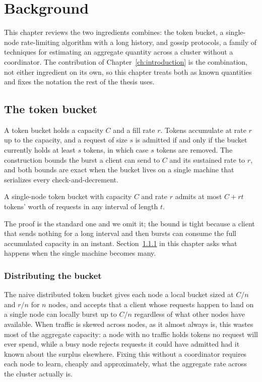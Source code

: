 \chapter{Background}
\label{ch:background}

This chapter reviews the two ingredients \sysname{} combines: the token bucket, a
single-node rate-limiting algorithm with a long history, and gossip protocols, a family of
techniques for estimating an aggregate quantity across a cluster without a coordinator. The
contribution of Chapter~\ref{ch:introduction} is the combination, not either ingredient on
its own, so this chapter treats both as known quantities and fixes the notation the rest of
the thesis uses.

\section{The token bucket}
\label{sec:token-bucket}

A token bucket holds a capacity $C$ and a fill rate $r$. Tokens accumulate at rate $r$ up
to the capacity, and a request of size $s$ is admitted if and only if the bucket currently
holds at least $s$ tokens, in which case $s$ tokens are removed. The construction bounds the
burst a client can send to $C$ and its sustained rate to $r$, and both bounds are exact when
the bucket lives on a single machine that serializes every check-and-decrement.

\begin{lemma}
\label{lem:token-bucket-exact}
A single-node token bucket with capacity $C$ and rate $r$ admits at most $C + rt$ tokens'
worth of requests in any interval of length $t$.
\end{lemma}

The proof is the standard one and we omit it; the bound is tight because a client that
sends nothing for a long interval and then bursts can consume the full accumulated
capacity in an instant. Section~\ref{sec:distributed-bucket} in this chapter asks what
happens when the single machine becomes many.

\subsection{Distributing the bucket}
\label{sec:distributed-bucket}

The naive distributed token bucket gives each node a local bucket sized at $C / n$ and
$r / n$ for $n$ nodes, and accepts that a client whose requests happen to land on a single
node can locally burst up to $C/n$ regardless of what other nodes have available. When
traffic is skewed across nodes, as it almost always is, this wastes most of the aggregate
capacity: a node with no traffic holds tokens no request will ever spend, while a busy node
rejects requests it could have admitted had it known about the surplus elsewhere. Fixing
this without a coordinator requires each node to learn, cheaply and approximately, what the
aggregate rate across the cluster actually is.

